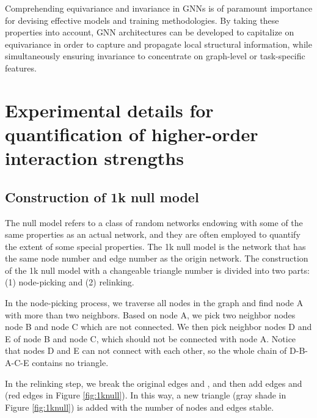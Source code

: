 \documentclass[letterpaper]{article} \usepackage{aaai24}
\theoremstyle{plain}
\theoremstyle{definition}
\theoremstyle{remark}
\begin{document}
Comprehending equivariance and invariance in GNNs is of paramount importance for devising effective models and training methodologies. By taking these properties into account, GNN architectures can be developed to capitalize on equivariance in order to capture and propagate local structural information, while simultaneously ensuring invariance to concentrate on graph-level or task-specific features.










\section{Experimental details for quantification of higher-order interaction strengths}
\label{appendix:S_p}











\subsection{Construction of 1k null model}
\label{appendix:1k}


The null model \cite{nullmodel} refers to a class of random networks endowing with some of the same properties as an actual network, and they are often employed to quantify the extent of some special properties.
The 1k null model \cite{YRM2023} is the network that has the same node number and edge number as the origin network.
The construction of the 1k null model with a changeable triangle number is divided into two parts: (1) node-picking and (2) relinking. 

In the node-picking process, we traverse all nodes in the graph and find node A with more than two neighbors. 
Based on node A, we pick two neighbor nodes node B and node C which are not connected.
We then pick neighbor nodes D and E of node B and node C, which should not be connected with node A. 
Notice that nodes D and E can not connect with each other, so the whole chain of D-B-A-C-E contains no triangle.

In the relinking step, we break the original edges  and , and then add edges  and  (red edges in Figure \ref{fig:1knull}). 
In this way, a new triangle  (gray shade in  Figure \ref{fig:1knull}) is added with the number of nodes and edges stable.
\end{document}

